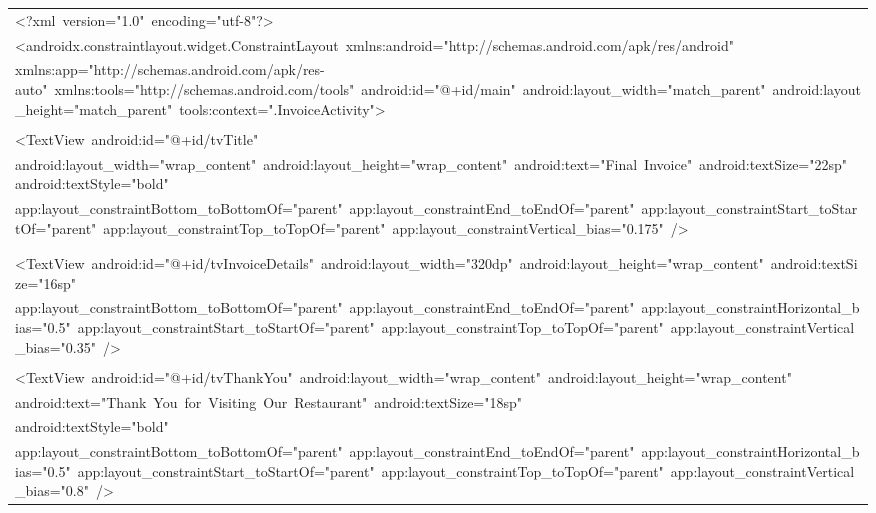 \documentclass[a4paper,12pt]{article}
\begin{document}
\begin{longtable}{|p{}|}
\hline
{\ttfamily\small \textless{}?xml\ version="1.0"\ encoding="utf-8"?\textgreater{}} \\
{\ttfamily\small \textless{}androidx.constraintlayout.widget.ConstraintLayout\ xmlns:android="http://schemas.android.com/apk/res/android"} \\
{\ttfamily\small xmlns:app="http://schemas.android.com/apk/res-auto"\ xmlns:tools="http://schemas.android.com/tools"\ android:id="@+id/main"\ android:layout\_width="match\_parent"\ android:layout\_height="match\_parent"\ tools:context=".InvoiceActivity"\textgreater{}} \\
\strut \\
{\ttfamily\small \textless{}TextView\ android:id="@+id/tvTitle"} \\
{\ttfamily\small android:layout\_width="wrap\_content"\ android:layout\_height="wrap\_content"\ android:text="Final\ Invoice"\ android:textSize="22sp"\ android:textStyle="bold"} \\
{\ttfamily\small app:layout\_constraintBottom\_toBottomOf="parent"\ app:layout\_constraintEnd\_toEndOf="parent"\ app:layout\_constraintStart\_toStartOf="parent"\ app:layout\_constraintTop\_toTopOf="parent"\ app:layout\_constraintVertical\_bias="0.175"\ /\textgreater{}} \\
\strut \\
\strut \\
{\ttfamily\small \textless{}TextView\ android:id="@+id/tvInvoiceDetails"\ android:layout\_width="320dp"\ android:layout\_height="wrap\_content"\ android:textSize="16sp"} \\
{\ttfamily\small app:layout\_constraintBottom\_toBottomOf="parent"\ app:layout\_constraintEnd\_toEndOf="parent"\ app:layout\_constraintHorizontal\_bias="0.5"\ app:layout\_constraintStart\_toStartOf="parent"\ app:layout\_constraintTop\_toTopOf="parent"\ app:layout\_constraintVertical\_bias="0.35"\ /\textgreater{}} \\
\strut \\
{\ttfamily\small \textless{}TextView\ android:id="@+id/tvThankYou"\ android:layout\_width="wrap\_content"\ android:layout\_height="wrap\_content"} \\
{\ttfamily\small android:text="Thank\ You\ for\ Visiting\ Our\ Restaurant"\ android:textSize="18sp"} \\
{\ttfamily\small android:textStyle="bold"} \\
{\ttfamily\small app:layout\_constraintBottom\_toBottomOf="parent"\ app:layout\_constraintEnd\_toEndOf="parent"\ app:layout\_constraintHorizontal\_bias="0.5"\ app:layout\_constraintStart\_toStartOf="parent"\ app:layout\_constraintTop\_toTopOf="parent"\ app:layout\_constraintVertical\_bias="0.8"\ /\textgreater{}} \\

\end{longtable}
\end{document}
